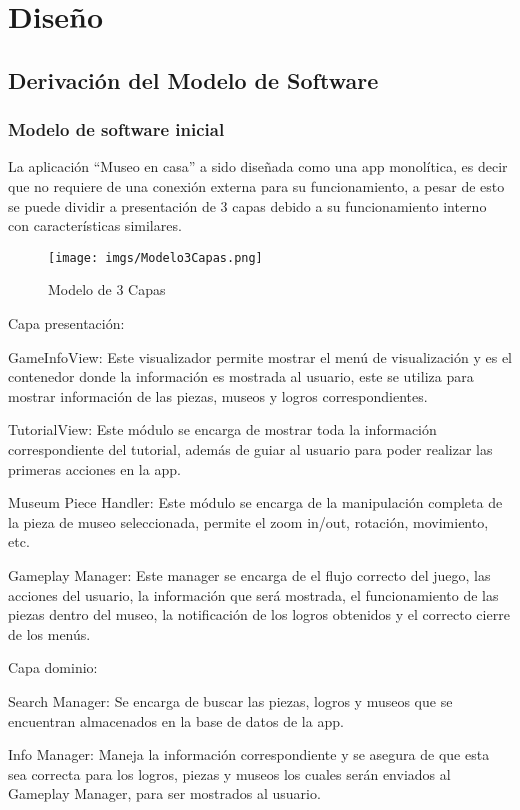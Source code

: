 \documentclass[12pt]{article}
\begin{document}
\newpage
\section{Diseño}

\subsection{Derivación del Modelo de Software}
\subsubsection{Modelo de software inicial}
La aplicación “Museo en casa” a sido diseñada como una app monolítica, es decir que no requiere de una conexión externa para su funcionamiento, a pesar de esto se puede dividir a presentación de 3 capas debido a su funcionamiento interno con características similares.

\begin{figure}[H]
\centerline{\texttt{[image: imgs/Modelo3Capas.png]}}
\caption{Modelo de 3 Capas}
\label{fig_3Capas}
\end{figure}

Capa presentación:

GameInfoView: Este visualizador permite mostrar el menú de visualización y es el contenedor donde la información es mostrada al usuario, este se utiliza para mostrar información de las piezas, museos y logros correspondientes.

TutorialView: Este módulo se encarga de mostrar toda la información correspondiente del tutorial, además de guiar al usuario para poder realizar las primeras acciones en la app.

Museum Piece Handler: Este módulo se encarga de la manipulación completa de la pieza de museo seleccionada, permite el zoom in/out, rotación, movimiento, etc.

Gameplay Manager:  Este manager se encarga de el flujo correcto del juego, las acciones del usuario, la información que será mostrada, el funcionamiento de las piezas dentro del museo, la notificación de los logros obtenidos y el correcto cierre de los menús.

Capa dominio:

Search Manager: Se encarga de buscar las piezas, logros y museos que se encuentran almacenados en la base de datos de la app.

Info Manager: Maneja la información correspondiente y se asegura de que esta sea correcta para  los logros, piezas y museos los cuales serán enviados al Gameplay Manager, para ser mostrados al usuario.
\end{document}
